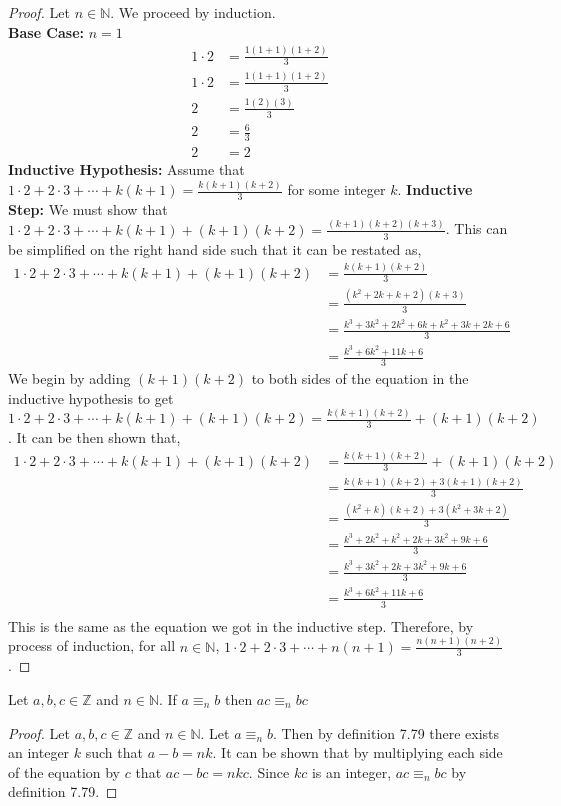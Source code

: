 \documentclass[12pt]{article}
\newenvironment{theorem}[2][Theorem]{\begin{trivlist}
\item[\hskip \labelsep {\bfseries #1}\hskip \labelsep {\bfseries #2.}]}{\end{trivlist}}
\begin{document}
	\begin{proof}
		Let $n \in \mathbb{N}$. We proceed by induction.\\
		\textbf{Base Case:} $n = 1$\\
		\begin{align}
			1\cdot2 &= \frac{1(1+1)(1+2)}{3}\\
			1\cdot2 &= \frac{1(1+1)(1+2)}{3}\\
			2 &= \frac{1(2)(3)}{3}\\
			2 &= \frac{6}{3}\\
			2 &= 2
		\end{align}
		\textbf{Inductive Hypothesis:} Assume that $1\cdot2 + 2\cdot3 + \cdots + k(k+1) = \frac{k(k+1)(k+2)}{3}$ for
		some integer $k$. 
		\textbf{Inductive Step:} We must show that $1\cdot2 + 2\cdot3 + \cdots + k(k+1) + (k+1)(k+2) = \frac{(k+1)(k+2)(k+3)}{3}$.
		This can be simplified on the right hand side such that it can be restated as,
		\begin{align}
		    1\cdot2 + 2\cdot3 + \cdots + k(k+1) + (k+1)(k+2) &= \frac{k(k+1)(k+2)}{3}\\
							&= \frac{(k^2+2k+k+2)(k+3)}{3}\\
							&= \frac{k^3+3k^2+2k^2+6k+k^2+3k+2k+6}{3}\\
							&= \frac{k^3+6k^2+11k+6}{3}
		\end{align}
		We begin by adding $(k+1)(k+2)$ to both sides of the equation in the inductive hypothesis to get
		$1\cdot2 + 2\cdot3 + \cdots + k(k+1) + (k+1)(k+2) = \frac{k(k+1)(k+2)}{3} + (k+1)(k+2)$.
		It can be then shown that,
		\begin{align}
		    1\cdot2 + 2\cdot3 + \cdots + k(k+1) + (k+1)(k+2) &= \frac{k(k+1)(k+2)}{3} + (k+1)(k+2)\\
								     &= \frac{k(k+1)(k+2)+3(k+1)(k+2)}{3}\\
								     &= \frac{(k^2+k)(k+2)+3(k^2+3k+2)}{3}\\
								     &= \frac{k^3+2k^2+k^2+2k+3k^2+9k+6}{3}\\
								     &= \frac{k^3+3k^2+2k+3k^2+9k+6}{3}\\
								     &= \frac{k^3+6k^2+11k+6}{3}\\
		\end{align}
		This is the same as the equation we got in the inductive step.
		Therefore, by process of induction, for all $n \in \mathbb{N}$, $1\cdot2 + 2\cdot3 + \cdots + n(n+1) = \frac{n(n+1)(n+2)}{3}$.
	\end{proof}
\begin{theorem}{4}
	Let $a,b,c \in \mathbb{Z}$ and $n\in \mathbb{N}$. If $a\equiv_nb$ then 
	$ac\equiv_nbc$
\end{theorem}
	\begin{proof}
		Let $a,b,c \in \mathbb{Z}$ and $n\in \mathbb{N}$. Let 
		$a\equiv_nb$. Then by definition 7.79 there exists an integer $k$ such that $a-b=nk$.
		It can be shown that by multiplying each side of the equation by $c$ that $ac-bc=nkc$.
		Since $kc$ is an integer, $ac\equiv_nbc$ by definition 7.79.
\end{proof}
	
\end{document}
